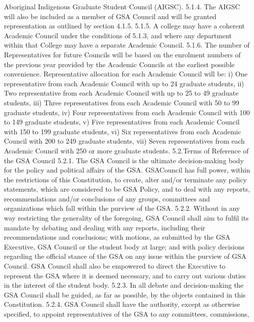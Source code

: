 \documentclass{article}
\begin{document}
Aboriginal Indigenous Graduate Student Council (AIGSC). 
5.1.4. The AIGSC will also be included as a member of GSA Council and 
will be granted representation as outlined by section 4.1.5. 
5.1.5. A college may have a coherent Academic Council under the conditions 
of 5.1.3, and where any department within that College may have a 
separate Academic Council. 
5.1.6. The number of Representatives for future Councils will be based on 
the enrolment numbers of the previous year provided by the Academic 
Councils at the earliest possible convenience. Representative allocation for each Academic Council will be: 
i) One representative from each Academic Council with up to 24 
graduate students, 
ii) Two representative from each Academic Council with up to 25 to 49 
graduate students, 
iii) Three representatives from each Academic Council with 50 to 99 
graduate students, 
iv) Four representatives from each Academic Council with 100 to 149 
graduate students, 
v) Five representatives from each Academic Council with 150 to 199 
graduate students, 
vi) Six representatives from each Academic Council with 200 to 249 
graduate students, 
vii) Seven representatives from each Academic Council with 250 or more 
graduate students. 
5.2.Terms of Reference of the GSA Council 
5.2.1. The GSA Council is the ultimate decision-making body for the policy 
and political affairs of the GSA. GSACouncil has full power, within 
the restrictions of this Constitution, to create, alter and/or terminate 
any policy statements, which are considered to be GSA Policy, and to 
deal with any reports, recommendations and/or conclusions of any 
groups, committees and organizations which fall within the purview of 
the GSA. 
5.2.2. Without in any way restricting the generality of the foregoing, GSA 
Council shall aim to fulfil its mandate by debating and dealing with 
any reports, including their recommendations and conclusions; with 
motions, as submitted by the GSA Executive, GSA Council or the 
student body at large; and with policy decisions regarding the official 
stance of the GSA on any issue within the purview of GSA Council. 
GSA Council shall also be empowered to direct the Executive to 
represent the GSA where it is deemed necessary, and to carry out 
various duties in the interest of the student body. 
5.2.3. In all debate and decision-making the GSA Council shall be guided, as 
far as possible, by the objects contained in this Constitution. 
5.2.4. GSA Council shall have the authority, except as otherwise specified, to 
appoint representatives of the GSA to any committees, commissions, 
\end{document}
